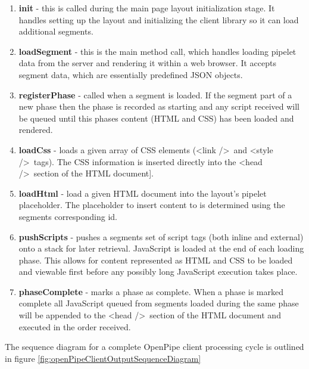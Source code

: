 \documentclass[12pt]{report}
\begin{document}
\begin{enumerate}
\item \textbf{init} - this is called during the main page layout initialization stage. It handles setting up the layout and initializing the client library so it can load additional segments.
\item \textbf{loadSegment} - this is the main method call, which handles loading pipelet data from the server and rendering it within a web browser. It accepts segment data, which are essentially predefined JSON objects.
\item \textbf{registerPhase} - called when a segment is loaded. If the segment part of  a new phase then the phase is recorded as starting and any script received will be queued until this phases content (HTML and CSS) has been loaded and rendered.
\item \textbf{loadCss} - loads a given array of CSS elements (\textless link /\textgreater\ and \textless style /\textgreater\ tags). The CSS information is inserted directly into the \textless head /\textgreater\ section of the HTML document].
\item \textbf{loadHtml} - load a given HTML document into the layout’s pipelet placeholder. The placeholder to insert content to is determined using the segments corresponding id.
\item \textbf{pushScripts} - pushes a segments set of script tags (both inline and external) onto a stack for later retrieval. JavaScript is loaded at the end of each loading phase. This allows for content represented as HTML and CSS to be loaded and viewable first before any possibly long JavaScript execution takes place.
\item \textbf{phaseComplete} - marks a phase as complete. When a phase is marked complete all JavaScript queued from segments loaded during the same phase will be appended to the \textless head /\textgreater\ section of the HTML document and executed in the order received.
\end{enumerate}

The sequence diagram for a complete OpenPipe client processing cycle is outlined in figure \ref{fig:openPipeClientOutputSequenceDiagram}
\end{document}
